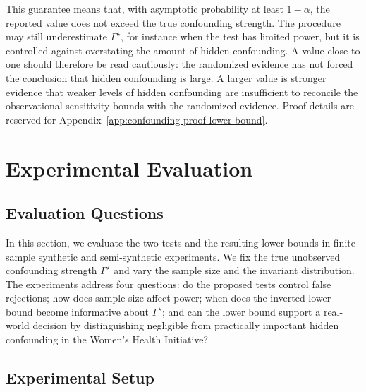 This guarantee means that, with asymptotic probability at least \(1-\alpha\), the reported value does not exceed the true confounding strength. The procedure may still underestimate \(\Gamma^{\star}\), for instance when the test has limited power, but it is controlled against overstating the amount of hidden confounding. A value close to one should therefore be read cautiously: the randomized evidence has not forced the conclusion that hidden confounding is large. A larger value is stronger evidence that weaker levels of hidden confounding are insufficient to reconcile the observational sensitivity bounds with the randomized evidence. Proof details are reserved for Appendix~\ref{app:confounding-proof-lower-bound}.

\section{Experimental Evaluation}
\label{sec:confounding-experiments}

\subsection{Evaluation Questions}

In this section, we evaluate the two tests and the resulting lower bounds in finite-sample synthetic and semi-synthetic experiments. We fix the true unobserved confounding strength \(\Gamma^{\star}\) and vary the sample size and the invariant distribution. The experiments address four questions: do the proposed tests control false rejections; how does sample size affect power; when does the inverted lower bound become informative about \(\Gamma^{\star}\); and can the lower bound support a real-world decision by distinguishing negligible from practically important hidden confounding in the Women's Health Initiative?

\subsection{Experimental Setup}

